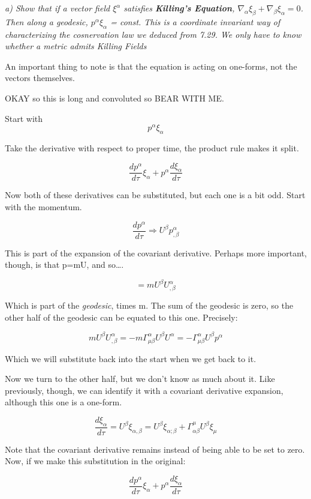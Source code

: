 \documentclass[landscape,letterpaper,10pt,english]{article}
\begin{document}
\[\label{P10}\]

\emph{a) Show that if a vector field \(\xi^\alpha\) satisfies
\textbf{Killing's Equation},
\(\nabla_\alpha \xi_\beta + \nabla_\beta \xi_\alpha = 0\). Then along a
geodesic, \(p^\alpha\xi_\alpha\) = const. This is a coordinate invariant
way of characterizing the cosnervation law we deduced from 7.29. We only
have to know whether a metric admits Killing Fields}

    An important thing to note is that the equation is acting on one-forms,
not the vectors themselves.

OKAY so this is long and convoluted so BEAR WITH ME.

Start with \[ p^\alpha \xi_\alpha \]

Take the derivative with respect to proper time, the product rule makes
it split.

\[ \frac{dp^\alpha}{d\tau} \xi_\alpha + p^\alpha \frac{d \xi_\alpha}{d\tau} \]

Now both of these derivatives can be substituted, but each one is a bit
odd. Start with the momentum.

\[ \frac{dp^\alpha}{d\tau} \Rightarrow U^\beta p^\alpha_{,\beta} \]

This is part of the expansion of the covariant derivative. Perhaps more
important, though, is that p=mU, and so\ldots.

\[ = m U^\beta U^\alpha_{,\beta} \]

Which is part of the \emph{geodesic}, times m. The sum of the geodesic
is zero, so the other half of the geodesic can be equated to this one.
Precisely:

\[ m U^\beta U^\alpha_{,\beta} = - m \Gamma^\alpha_{\mu\beta} U^\beta U^\alpha = - \Gamma^\alpha_{\mu\beta} U^\beta p^\alpha \]

Which we will substitute back into the start when we get back to it.

Now we turn to the other half, but we don't know as much about it. Like
previously, though, we can identify it with a covariant derivative
expansion, although this one is a one-form.

\[ \frac{d\xi_\alpha}{d\tau} = U^\beta\xi_{\alpha,\beta} = U^\beta \xi_{\alpha;\beta} + \Gamma^\mu_{\alpha\beta} U^\beta \xi_\mu \]

Note that the covariant derivative remains instead of being able to be
set to zero. Now, if we make this substitution in the original:

\[ \frac{dp^\alpha}{d\tau} \xi_\alpha + p^\alpha \frac{d \xi_\alpha}{d\tau} \]
\end{document}
